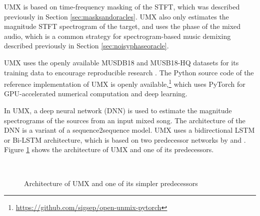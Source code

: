 \documentclass[report.tex]{subfiles}
\begin{document}
UMX is based on time-frequency masking of the STFT, which was described previously in Section \ref{sec:masksandoracles}. UMX also only estimates the magnitude STFT spectrogram of the target, and uses the phase of the mixed audio, which is a common strategy for spectrogram-based music demixing described previously in Section \ref{sec:noisyphaseoracle}.

UMX uses the openly available MUSDB18 and MUSB18-HQ datasets for its training data \parencite{musdb18, musdb18hq} to encourage reproducible research \parencite{umx}. The Python source code of the reference implementation of UMX is openly available,\footnote{\url{https://github.com/sigsep/open-unmix-pytorch}} which uses PyTorch \parencite{pytorch} for GPU-accelerated numerical computation and deep learning.

In UMX, a deep neural network (DNN) is used to estimate the magnitude spectrograms of the sources from an input mixed song. The architecture of the DNN is a variant of a sequence2sequence model. UMX uses a bidirectional LSTM or Bi-LSTM architecture, which is based on two predecessor networks by \textcite{umxorig1} and \textcite{umxorig2}. Figure \ref{fig:umxes} shows the architecture of UMX and one of its predecessors.

\begin{figure}[ht]
	\centering
	\\
	\caption{Architecture of UMX and one of its simpler predecessors}
	\label{fig:umxes}
\end{figure}
\end{document}
